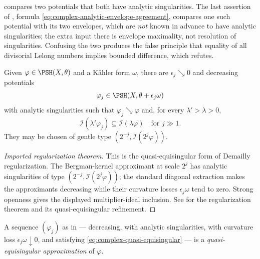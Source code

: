 \begin{remark}
\label{rem:ch51-rigidity}
 compares two potentials that both have
analytic singularities.  The last assertion of
, formula
\eqref{eq:complex-analytic-envelope-agreement}, compares one such
potential with its two envelopes, which are \emph{not} known in advance to
have analytic singularities; the extra input there is envelope maximality,
not resolution of singularities.  Confusing the two produces the false
principle that equality of all divisorial Lelong numbers implies bounded
difference, which  refutes.
\end{remark}

\begin{proposition}\label{prop:complex-quasi-equisingular}
Given \(\varphi\in\PSH(X,\theta)\) and a K\"ahler form \(\omega\), there
are \(\epsilon_j\searrow0\) and decreasing potentials
\[
 \varphi_j\in\PSH(X,\theta+\epsilon_j\omega)
\]
with analytic singularities such that \(\varphi_j\searrow\varphi\) and,
for every \(\lambda'>\lambda>0\),
\[
 \mathcal I(\lambda'\varphi_j)
          \subseteq\mathcal I(\lambda\varphi)
 \quad\text{for }j\gg1.
\tag{51.14}\label{eq:complex-quasi-equisingular}
\]
They may be chosen of gentle type
\((2^{-j},\mathcal I(2^j\varphi))\).
\end{proposition}

\begin{proof}[Imported regularization theorem]
This is the quasi-equisingular form of Demailly regularization.  The
Bergman-kernel approximant at scale \(2^j\) has analytic singularities
of type \((2^{-j},\mathcal I(2^j\varphi))\); the standard diagonal
extraction makes the approximants decreasing while their curvature
losses \(\epsilon_j\omega\) tend to zero.  Strong openness gives the
displayed multiplier-ideal inclusion.  See
\cite{Dem92reg,DPS01} for the regularization theorem and its
quasi-equisingular refinement.
\end{proof}

\begin{definition}
\label{def:ch51-quasi-equisingular}
A sequence \((\varphi_j)\) as in
 --- decreasing, with analytic
singularities, with curvature loss \(\epsilon_j\omega\downarrow0\), and
satisfying \eqref{eq:complex-quasi-equisingular} --- is a
\emph{quasi-equisingular approximation} of \(\varphi\).
\end{definition}

